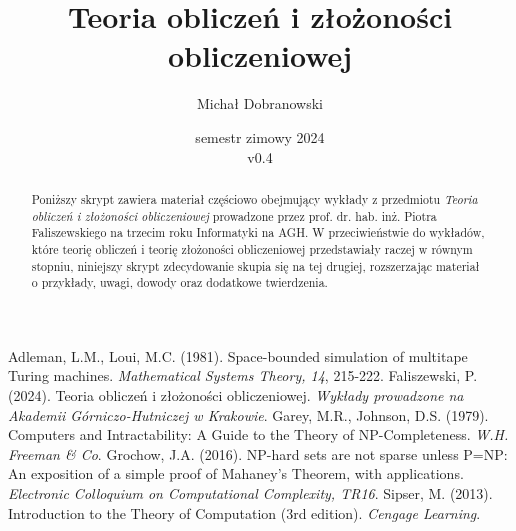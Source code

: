 \documentclass[pretty,polish,bibliography=totocnumbered]{angav}
\title{Teoria obliczeń i złożoności obliczeniowej}
\author{Michał Dobranowski}
\date{semestr zimowy 2024 \\ v0.4}
\begin{document}
    \maketitle
    \begin{abstract}
        \noindent Poniższy skrypt zawiera materiał częściowo obejmujący wykłady z przedmiotu \textit{Teoria obliczeń i złożoności obliczeniowej} prowadzone przez prof. dr. hab. inż. Piotra Faliszewskiego na trzecim roku Informatyki na AGH. W przeciwieństwie do wykładów, które teorię obliczeń i teorię złożoności obliczeniowej przedstawiały raczej w równym stopniu, niniejszy skrypt zdecydowanie skupia się na tej drugiej, rozszerzając materiał o przykłady, uwagi, dowody oraz dodatkowe twierdzenia.
    \end{abstract}
    \vspace*{\fill}
    {\footnotesize\doclicenseThis}
    \newpage

    \tableofcontents
    \newpage

    \SetVertexStyle[FillColor=gray, FillOpacity=0.4]
    \SetEdgeStyle[Color=black, LineWidth=0.8pt]

    
    

    \begin{thebibliography}{9}
         Adleman, L.M., Loui, M.C. (1981). Space-bounded simulation of multitape Turing machines. \textit{Mathematical Systems Theory, 14}, 215-222.
         Faliszewski, P. (2024). Teoria obliczeń i złożoności obliczeniowej. \textit{Wykłady prowadzone na Akademii Górniczo-Hutniczej w Krakowie}.
         Garey, M.R., Johnson, D.S. (1979). Computers and Intractability: A Guide to the Theory of NP-Completeness. \textit{W.H. Freeman \& Co}.
         Grochow, J.A. (2016). NP-hard sets are not sparse unless P=NP: An exposition of a simple proof of Mahaney's Theorem, with applications. \textit{Electronic Colloquium on Computational Complexity, TR16}.
         Sipser, M. (2013). Introduction to the Theory of Computation (3rd edition). \textit{Cengage Learning}.
    \end{thebibliography}

    
\end{document}
